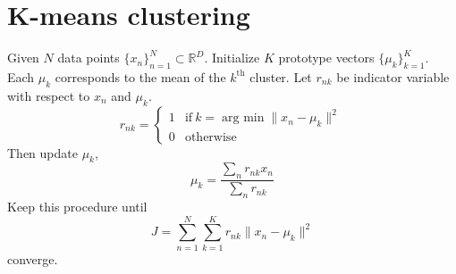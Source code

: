 \documentclass{article}
\DeclareMathOperator*{\argmin}{arg~min}
\begin{document}
    \section{K-means clustering}
        Given $N$ data points $\{x_n\}_{n=1}^N\subset\mathbb{R}^D$. Initialize $K$ prototype vectors $\{\mu_k\}_{k=1}^K$. Each $\mu_k$ corresponds to the mean of the $k^\mathrm{th}$ cluster. Let $r_{nk}$ be indicator variable with respect to $x_n$ and $\mu_k$.
        \[
            r_{nk}=\left\{
                \begin{array}{ll}
                    1&\mathrm{if~}k=\argmin\|x_n-\mu_k\|^2\\
                    0&\mathrm{otherwise}
                \end{array}
            \right.
        \]
        Then update $\mu_k$,
        \[
            \mu_k = \frac{\sum_n r_{nk}x_n}{\sum_n r_{nk}}
        \]
        Keep this procedure until
        \[
            J = \sum_{n=1}^N\sum_{k=1}^Kr_{nk}\|x_n-\mu_k\|^2
        \]
        converge.
\end{document}
